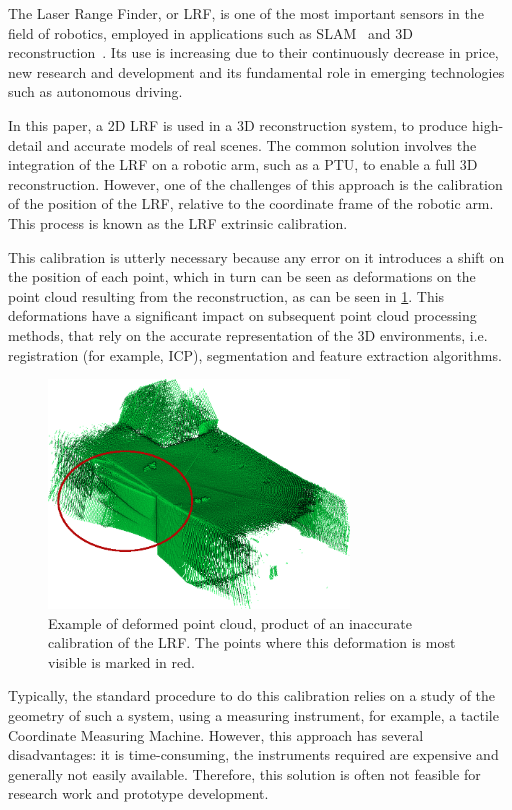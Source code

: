\documentclass[conference]{IEEEtran}
\begin{document}
The Laser Range Finder, or LRF, is one of the most important sensors in the field of robotics, employed in applications such as SLAM~\cite{wang14,eyice18} and 3D reconstruction~\cite{klimentjew10,saito10}. Its use is increasing due to their continuously decrease in price, new research and development and its fundamental role in emerging technologies such as autonomous driving.

In this paper, a 2D LRF is used in a 3D reconstruction system, to produce high-detail and accurate models of real scenes. The common solution involves the integration of the LRF on a robotic arm, such as a PTU, to enable a full 3D reconstruction. However, one of the challenges of this approach is the calibration of the position of the LRF, relative to the coordinate frame of the robotic arm. This process is known as the LRF extrinsic calibration.

This calibration is utterly necessary because any error on it introduces a shift on the position of each point, which in turn can be seen as deformations on the point cloud resulting from the reconstruction, as can be seen in \cref{fig:deformed-pointcloud}. This deformations have a significant impact on subsequent point cloud processing methods, that rely on the accurate representation of the 3D environments, i.e. registration (for example, ICP), segmentation and feature extraction algorithms. 

\begin{figure}[h]
    \centering
    \includegraphics[width=8cm]{images/bad-pointcloud.png}
    \caption{Example of deformed point cloud, product of an inaccurate calibration of the LRF. The points where this deformation is most visible is marked in red.}
    \label{fig:deformed-pointcloud}
\end{figure}

Typically, the standard procedure to do this calibration relies on a study of the geometry of such a system, using a measuring instrument, for example, a tactile Coordinate Measuring Machine. However, this approach has several disadvantages: it is time-consuming, the instruments required are expensive and generally not easily available. Therefore, this solution is often not feasible for research work and prototype development.
\end{document}
